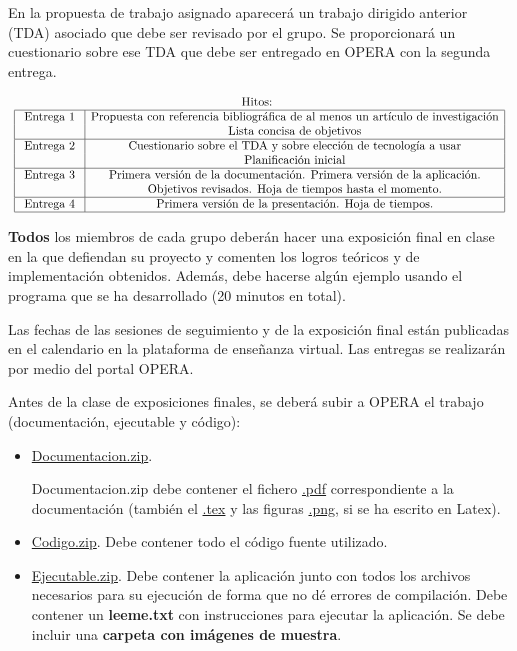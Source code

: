 \documentclass{pid}
\begin{document}
 En la propuesta de trabajo asignado aparecerá un trabajo dirigido anterior (TDA) asociado que debe ser revisado por el grupo. Se proporcionará un cuestionario sobre ese TDA que debe ser entregado en OPERA con la segunda entrega.

$$
\begin{array}{c}
\mbox{Hitos: }\\
\begin{array}{|c|c|}\hline
\mbox{ Entrega 1 }& \mbox{Propuesta con referencia bibliográfica de al menos un artículo de investigación}\\
&  \mbox{Lista concisa de objetivos}\\
\hline
\mbox{ Entrega 2  }& \mbox{Cuestionario sobre el TDA y sobre elección de tecnología a usar}\\
& \mbox{Planificación inicial}\\
\hline
\mbox{ Entrega 3 }& \mbox{Primera versión de la documentación. Primera versión de la aplicación.}\\
& \mbox{Objetivos revisados. Hoja de tiempos hasta el momento.}\\
\hline
\mbox{ Entrega 4 }& \mbox{Primera versión de la presentación. Hoja de tiempos.}\\
\hline
\end{array}
\end{array}$$


{\bf Todos} los miembros de cada grupo deberán hacer una exposición final en clase en la que defiendan su proyecto y comenten los logros teóricos y de implementación obtenidos. Además, debe hacerse algún ejemplo usando el programa que se ha desarrollado (20 minutos en total).

Las fechas de las sesiones de seguimiento y de la exposición final están publicadas en el calendario en la plataforma de enseñanza virtual. Las entregas se realizarán por medio del portal OPERA.

Antes de la clase de exposiciones finales, se deberá subir a OPERA el trabajo (documentación, ejecutable y código):

 \begin{itemize}
\item \url{Documentacion.zip}.

Documentacion.zip debe contener el fichero \url{.pdf} correspondiente a la documentación (también el \url{.tex} y las figuras \url{.png}, si se ha escrito en Latex). 

\item \url{Codigo.zip}. Debe contener todo el código fuente utilizado.
\item \url {Ejecutable.zip}. Debe contener la aplicación junto con todos los archivos necesarios para su ejecución de forma que no dé errores de compilación.
Debe contener un {\bf leeme.txt} con instrucciones para ejecutar la aplicación.
Se debe incluir una {\bf carpeta con imágenes de muestra}.

\end{itemize}
\end{document}
